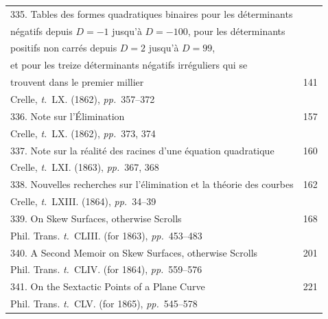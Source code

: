 \documentclass[11pt,a4paper]{article}
\newcommand{\tome}{\textit{t.}}
\newcommand{\pages}{\textit{pp.}}
\begin{document}
\begin{longtable}{p{4.5in}r}
\multicolumn{2}{l}{335. Tables des formes quadratiques binaires pour les d\'{e}terminants} \\[-0.3em]
\multicolumn{2}{l}{\quad n\'{e}gatifs depuis $D = -1$ jusqu'\`{a} $D = -100$, pour les d\'{e}terminants} \\[-0.3em]
\multicolumn{2}{l}{\quad positifs non carr\'{e}s depuis $D = 2$ jusqu'\`{a} $D = 99$,} \\[-0.3em]
\multicolumn{2}{l}{\quad et pour les treize d\'{e}terminants n\'{e}gatifs irr\'{e}guliers qui se} \\[-0.3em]
\quad trouvent dans le premier millier & 141 \\[-0.3em]
\multicolumn{2}{l}{\quad\small Crelle, \tome~LX. (1862), \pages~357--372} \\[0.5em]

336. Note sur l'\'{E}limination & 157 \\[-0.3em]
\multicolumn{2}{l}{\quad\small Crelle, \tome~LX. (1862), \pages~373, 374} \\[0.5em]

337. Note sur la r\'{e}alit\'{e} des racines d'une \'{e}quation quadratique & 160 \\[-0.3em]
\multicolumn{2}{l}{\quad\small Crelle, \tome~LXI. (1863), \pages~367, 368} \\[0.5em]

338. Nouvelles recherches sur l'\'{e}limination et la th\'{e}orie des courbes & 162 \\[-0.3em]
\multicolumn{2}{l}{\quad\small Crelle, \tome~LXIII. (1864), \pages~34--39} \\[0.5em]

339. On Skew Surfaces, otherwise Scrolls & 168 \\[-0.3em]
\multicolumn{2}{l}{\quad\small Phil. Trans. \tome~CLIII. (for 1863), \pages~453--483} \\[0.5em]

340. A Second Memoir on Skew Surfaces, otherwise Scrolls & 201 \\[-0.3em]
\multicolumn{2}{l}{\quad\small Phil. Trans. \tome~CLIV. (for 1864), \pages~559--576} \\[0.5em]

341. On the Sextactic Points of a Plane Curve & 221 \\[-0.3em]
\multicolumn{2}{l}{\quad\small Phil. Trans. \tome~CLV. (for 1865), \pages~545--578} \\[0.5em]


\end{longtable}
\end{document}
